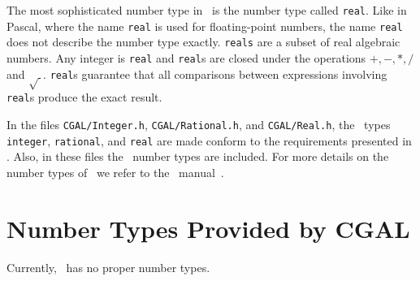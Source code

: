 The most sophisticated number type in \leda\ is the number type called
{\tt real}. Like in Pascal, where the name {\tt real} is used for
floating-point numbers, the name {\tt real} does not describe the
number type exactly.  {\tt reals} are a subset of real algebraic
numbers.  Any integer is {\tt real} and {\tt real}s are closed under
the operations $+,-,*,/$ and $\sqrt{\ }$. {\tt real}s guarantee that
all comparisons between expressions involving {\tt real}s produce the
exact result.

In the files {\tt CGAL/Integer.h}, {\tt CGAL/Rational.h}, and
{\tt CGAL/Real.h}, the \leda\ types {\tt integer}, {\tt rational},
and {\tt real} are made conform to the requirements presented in
. 
Also, in these files the \leda\ number types are included.
For more details on the number types of \leda\ we refer to the \leda\ 
manual~\cite{leda-manual}.


\section{Number Types Provided by CGAL}

Currently, \cgal\ has no proper number types. 

